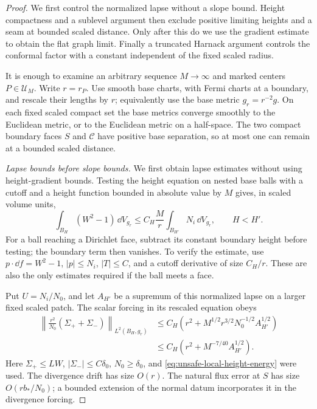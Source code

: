 \begin{proof}
We first control the normalized lapse without a slope bound.
Height compactness and a sublevel argument then exclude positive
limiting heights and a seam at bounded scaled distance.
Only after this do we use the gradient estimate to obtain the flat
graph limit. Finally a truncated Harnack argument controls the
conformal factor with a constant independent of the fixed scaled radius.

It is enough to examine an arbitrary sequence \(M\to\infty\) and
marked centers \(P\in\mathcal U_M\).  Write \(r=r_P\).  Use smooth
base charts, with Fermi charts at a boundary, and rescale their lengths
by \(r\); equivalently use the base metric \(g_r=r^{-2}g\).  On each
fixed scaled compact set the base metrics converge smoothly to the
Euclidean metric, or to the Euclidean metric on a half-space.  The two
compact boundary faces \(S\) and \(\mathcal C\) have positive base
separation, so at most one can remain at a bounded scaled distance.

\smallskip\noindent\emph{Lapse bounds before slope bounds.}
We first obtain lapse estimates without using height-gradient bounds.
Testing the height equation on nested base balls with a cutoff and a
height function bounded in absolute value by \(M\) gives, in scaled
volume units,
\begin{equation}
 \int_{B_H}(W^2-1)\,\dd V_{g_r}
 \le C_H\frac{M}{r}
       \int_{B_{H'}}N_i\,\dd V_{g_r},\qquad H<H'.
 \label{eq:unsafe-local-height-energy}
\end{equation}
For a ball reaching a Dirichlet face, subtract its constant boundary
height before testing; the boundary term then vanishes.  To verify the
estimate, use \(p\cdot\dd f=W^2-1\), \(|p|\le N_i\),
\(|T|\le C\), and a cutoff derivative of size \(C_H/r\).
These are also the only estimates required if the ball meets a face.

Put \(U=N_i/N_0\), and let \(A_{H'}\) be a supremum of this
normalized lapse on a larger fixed scaled patch.  The scalar forcing
in its rescaled equation obeys
\begin{align}
 \left\|\frac{r^2}{N_0}(\Sigma_++\Sigma_-)\right\|_{L^2(B_H,g_r)}
 &\le C_H\left(r^2+
       M^{1/2}r^{3/2}N_0^{-1/2}A_{H'}^{1/2}\right) \\
 &\le C_H\left(r^2+M^{-7/40}A_{H'}^{1/2}\right).
 \label{eq:unsafe-scaled-source}
\end{align}
Here \(\Sigma_+\le LW\), \(|\Sigma_-|\le C\delta_0\),
\(N_0\ge\delta_0\), and \eqref{eq:unsafe-local-height-energy} were
used.  The divergence drift has size \(O(r)\).  The natural flux
error at \(S\) has size \(O(rb_*/N_0)\); a bounded extension of the
normal datum incorporates it in the divergence forcing.


\end{proof}
